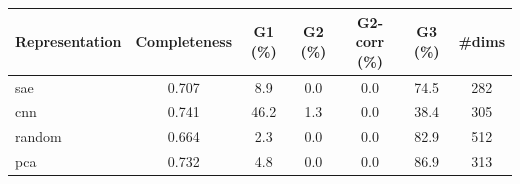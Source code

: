 \begin{tabular}{lcccccc}
\toprule
Representation & Completeness & G1 (\%) & G2 (\%) & G2-corr (\%) & G3 (\%) & \#dims \\
\midrule
sae & 0.707 & 8.9 & 0.0 & 0.0 & 74.5 & 282 \\
cnn & 0.741 & 46.2 & 1.3 & 0.0 & 38.4 & 305 \\
random & 0.664 & 2.3 & 0.0 & 0.0 & 82.9 & 512 \\
pca & 0.732 & 4.8 & 0.0 & 0.0 & 86.9 & 313 \\
\bottomrule
\end{tabular}